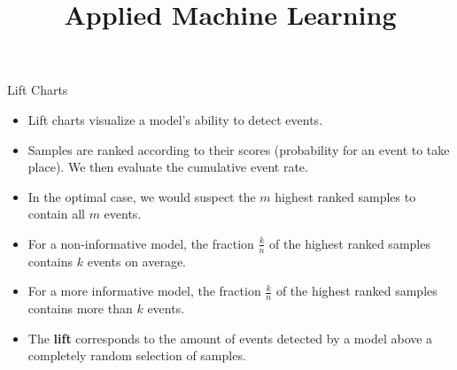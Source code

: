 \documentclass[11pt,compress,t,notes=noshow, xcolor=table]{beamer}
\title{Applied Machine Learning}
\date{}
\begin{document}


\begin{frame}{Lift Charts}

\begin{itemize}
\setlength\itemsep{1em}
    \item Lift charts visualize a model's ability to detect events.
    \item Samples are ranked according to their scores (probability for an event to take place). We then evaluate the cumulative event rate.
    \item In the optimal case, we would suspect the $m$ highest ranked samples to contain all $m$ events.
    \item For a non-informative model, the fraction $\frac{k}{n}$ of the highest ranked samples contains $k$ events on average.
    \item For a more informative model, the fraction $\frac{k}{n}$ of the highest ranked samples contains more than $k$ events.
    \item The \textbf{lift} corresponds to the amount of events detected by a model above a completely random selection of samples.
\end{itemize}
\end{frame}
\end{document}
